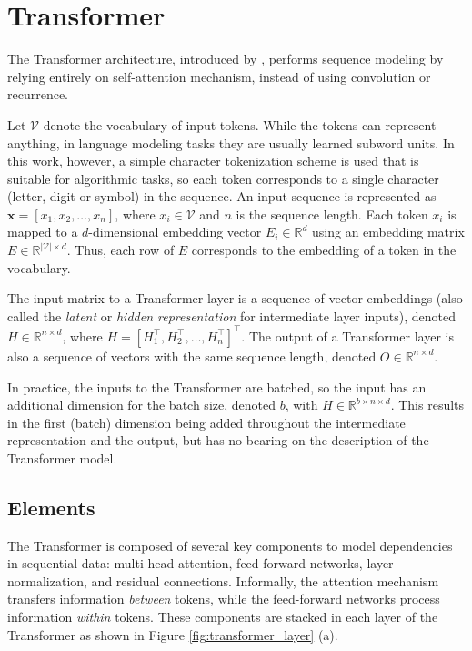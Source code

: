\section{Transformer}\label{sec:transformer_arch}

The Transformer architecture, introduced by \textcite{vaswani_attention_2017}, performs sequence modeling by relying entirely on self-attention mechanism, instead of using convolution or recurrence.

Let $\mathcal{V}$ denote the vocabulary of input tokens. While the tokens can represent anything, in language modeling tasks they are usually learned subword units. In this work, however, a simple character tokenization scheme is used that is suitable for algorithmic tasks, so each token corresponds to a single character (letter, digit or symbol) in the sequence. An input sequence is represented as $\mathbf{x} = [x_1, x_2, \dots, x_n]$, where $x_i \in \mathcal{V}$ and $n$ is the sequence length. Each token $x_i$ is mapped to a $d$-dimensional embedding vector $E_i \in \mathbb{R}^d$ using an embedding matrix $E \in \mathbb{R}^{|\mathcal{V}| \times d}$. Thus, each row of $E$ corresponds to the embedding of a token in the vocabulary.

The input matrix to a Transformer layer is a sequence of vector embeddings (also called the \emph{latent} or \emph{hidden representation} for intermediate layer inputs), denoted $H \in \mathbb{R}^{n \times d}$, where $H = [H_1^\top, H_2^\top, \dots, H_n^\top]^\top$. The output of a Transformer layer is also a sequence of vectors with the same sequence length, denoted $O \in \mathbb{R}^{n \times d}$.

In practice, the inputs to the Transformer are batched, so the input has an additional dimension for the batch size, denoted $b$, with $H \in \mathbb{R}^{b \times n \times d}$. This results in the first (batch) dimension being added throughout the intermediate representation and the output, but has no bearing on the description of the Transformer model.

\subsection{Elements}\label{subsec:elements_transformers}

The Transformer is composed of several key components to model dependencies in sequential data: multi-head attention, feed-forward networks, layer normalization, and residual connections. Informally, the attention mechanism transfers information \emph{between} tokens, while the feed-forward networks process information \emph{within} tokens. These components are stacked in each layer of the Transformer as shown in Figure \ref{fig:transformer_layer} (a).

